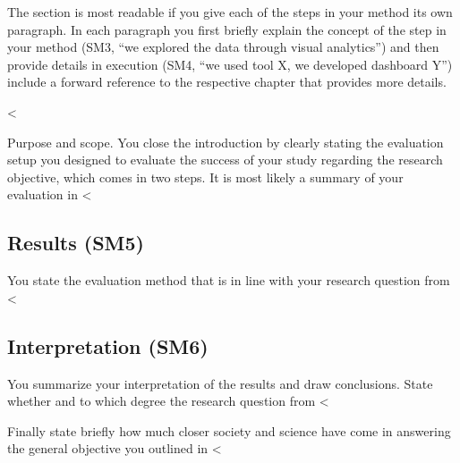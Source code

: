 \documentclass[runningheads,a4paper,english]{llncs}[2018/03/10]
\begin{document}
{The section is most readable if you give each of the steps in your method its own paragraph. In each paragraph you first briefly explain the concept of the step in your method (SM3, ``we explored the data through visual analytics'') and then provide details in execution (SM4, ``we used tool X, we developed dashboard Y'') include a forward reference to the respective chapter that provides more details.

<%

\textsf{Purpose and scope}. You close the introduction by clearly stating the evaluation setup you designed to evaluate the success of your study regarding the research objective, which comes in two steps. It is most likely a summary of your evaluation in <%

\subsection*{Results (SM5)}

You state the evaluation method that is in line with your research question from <%

\subsection*{Interpretation (SM6)}

You summarize your interpretation of the results and draw conclusions. State whether and to which degree the research question from <%

Finally state briefly how much closer society and science have come in answering the general objective you outlined in <%



}
\end{document}
